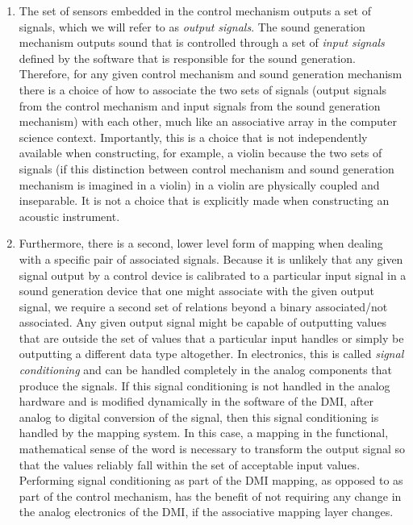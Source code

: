\begin{enumerate}
\item The set of sensors embedded in the control mechanism outputs a set of signals, which we will refer to as \emph{output signals}. The sound generation mechanism outputs sound that is controlled through a set of \emph{input signals} defined by the software that is responsible for the sound generation. Therefore, for any given control mechanism and sound generation mechanism there is a choice of how to associate the two sets of signals (output signals from the control mechanism and input signals from the sound generation mechanism) with each other, much like an associative array in the computer science context. Importantly, this is a choice that is not independently available when constructing, for example, a violin because the two sets of signals (if this distinction between control mechanism and sound generation mechanism is imagined in a violin) in a violin are physically coupled and inseparable. It is not a choice that is explicitly made when constructing an acoustic instrument.

\item Furthermore, there is a second, lower level form of mapping when dealing with a specific pair of associated signals. Because it is unlikely that any given signal output by a control device is calibrated to a particular input signal in a sound generation device that one might associate with the given output signal, we require a second set of relations beyond a binary associated/not associated. Any given output signal might be capable of outputting values that are outside the set of values that a particular input handles or simply be outputting a different data type altogether. In electronics, this is called \emph{signal conditioning} and can be handled completely in the analog components that produce the signals. If this signal conditioning is not handled in the analog hardware and is modified dynamically in the software of the DMI, after analog to digital conversion of the signal, then this signal conditioning is handled by the mapping system. In this case, a mapping in the functional, mathematical sense of the word is necessary to transform the output signal so that the values reliably fall within the set of acceptable input values. Performing signal conditioning as part of the DMI mapping, as opposed to as part of the control mechanism, has the benefit of not requiring any change in the analog electronics of the DMI, if the associative mapping layer changes.
\end{enumerate}


